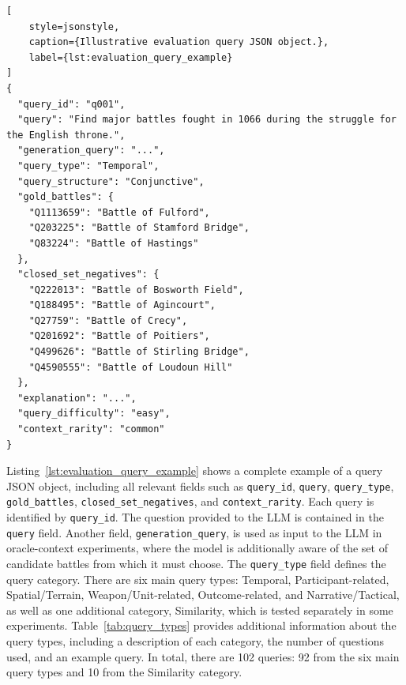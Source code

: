 \begin{minipage}{\textwidth}
\begin{lstlisting}[
    style=jsonstyle,
    caption={Illustrative evaluation query JSON object.},
    label={lst:evaluation_query_example}
]
{
  "query_id": "q001",
  "query": "Find major battles fought in 1066 during the struggle for the English throne.",
  "generation_query": "...",
  "query_type": "Temporal",
  "query_structure": "Conjunctive",
  "gold_battles": {
    "Q1113659": "Battle of Fulford",
    "Q203225": "Battle of Stamford Bridge",
    "Q83224": "Battle of Hastings"
  },
  "closed_set_negatives": {
    "Q222013": "Battle of Bosworth Field",
    "Q188495": "Battle of Agincourt",
    "Q27759": "Battle of Crecy",
    "Q201692": "Battle of Poitiers",
    "Q499626": "Battle of Stirling Bridge",
    "Q4590555": "Battle of Loudoun Hill"
  },
  "explanation": "...",
  "query_difficulty": "easy",
  "context_rarity": "common"
}
\end{lstlisting}
\end{minipage}
Listing~\ref{lst:evaluation_query_example} shows a complete example of a query JSON object, including all relevant fields such as \texttt{query\_id}, \texttt{query}, \texttt{query\_type}, \texttt{gold\_battles}, \texttt{closed\_set\_negatives}, and \texttt{context\_rarity}. Each query is identified by \texttt{query\_id}. The question provided to the LLM is contained in the \texttt{query} field. Another field, \texttt{generation\_query}, is used as input to the LLM in oracle-context experiments, where the model is additionally aware of the set of candidate battles from which it must choose. The \texttt{query\_type} field defines the query category. There are six main query types: Temporal, Participant-related, Spatial/Terrain, Weapon/Unit-related, Outcome-related, and Narrative/Tactical, as well as one additional category, Similarity, which is tested separately in some experiments. Table~\ref{tab:query_types} provides additional information about the query types, including a description of each category, the number of questions used, and an example query. In total, there are 102 queries: 92 from the six main query types and 10 from the Similarity category.

